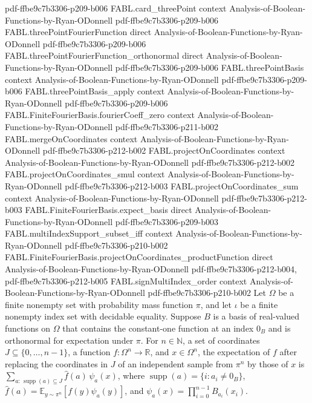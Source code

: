\begin{theorem}
  {pdf-ffbe9c7b3306-p209-b006}
\proofstep
  {FABL.card_threePoint}
  {context}
  {Analysis-of-Boolean-Functions-by-Ryan-ODonnell}
  {pdf-ffbe9c7b3306-p209-b006}
\proofstep
  {FABL.threePointFourierFunction}
  {direct}
  {Analysis-of-Boolean-Functions-by-Ryan-ODonnell}
  {pdf-ffbe9c7b3306-p209-b006}
\proofstep
  {FABL.threePointFourierFunction_orthonormal}
  {direct}
  {Analysis-of-Boolean-Functions-by-Ryan-ODonnell}
  {pdf-ffbe9c7b3306-p209-b006}
\proofstep
  {FABL.threePointBasis}
  {context}
  {Analysis-of-Boolean-Functions-by-Ryan-ODonnell}
  {pdf-ffbe9c7b3306-p209-b006}
\proofstep
  {FABL.threePointBasis_apply}
  {context}
  {Analysis-of-Boolean-Functions-by-Ryan-ODonnell}
  {pdf-ffbe9c7b3306-p209-b006}
\proofstep
  {FABL.FiniteFourierBasis.fourierCoeff_zero}
  {context}
  {Analysis-of-Boolean-Functions-by-Ryan-ODonnell}
  {pdf-ffbe9c7b3306-p211-b002}
\proofstep
  {FABL.mergeOnCoordinates}
  {context}
  {Analysis-of-Boolean-Functions-by-Ryan-ODonnell}
  {pdf-ffbe9c7b3306-p212-b002}
\proofstep
  {FABL.projectOnCoordinates}
  {context}
  {Analysis-of-Boolean-Functions-by-Ryan-ODonnell}
  {pdf-ffbe9c7b3306-p212-b002}
\proofstep
  {FABL.projectOnCoordinates_smul}
  {context}
  {Analysis-of-Boolean-Functions-by-Ryan-ODonnell}
  {pdf-ffbe9c7b3306-p212-b003}
\proofstep
  {FABL.projectOnCoordinates_sum}
  {context}
  {Analysis-of-Boolean-Functions-by-Ryan-ODonnell}
  {pdf-ffbe9c7b3306-p212-b003}
\proofstep
  {FABL.FiniteFourierBasis.expect_basis}
  {direct}
  {Analysis-of-Boolean-Functions-by-Ryan-ODonnell}
  {pdf-ffbe9c7b3306-p209-b003}
\proofstep
  {FABL.multiIndexSupport_subset_iff}
  {context}
  {Analysis-of-Boolean-Functions-by-Ryan-ODonnell}
  {pdf-ffbe9c7b3306-p210-b002}
\proofstep
  {FABL.FiniteFourierBasis.projectOnCoordinates_productFunction}
  {direct}
  {Analysis-of-Boolean-Functions-by-Ryan-ODonnell}
  {pdf-ffbe9c7b3306-p212-b004,
    pdf-ffbe9c7b3306-p212-b005}
\proofstep
  {FABL.signMultiIndex_order}
  {context}
  {Analysis-of-Boolean-Functions-by-Ryan-ODonnell}
  {pdf-ffbe9c7b3306-p210-b002}
Let $\Omega$ be a finite nonempty set with probability mass function $\pi$, and let
$\iota$ be a finite nonempty index set with decidable equality. Suppose $B$ is a basis
of real-valued functions on $\Omega$ that contains the constant-one function at an index
$0_B$ and is orthonormal for expectation under $\pi$. For $n\in\mathbb{N}$, a set of
coordinates $J\subseteq\{0,\ldots,n-1\}$, a function $f:\Omega^n\to\mathbb{R}$, and
$x\in\Omega^n$, the expectation of $f$ after replacing the coordinates in $J$ of an
independent sample from $\pi^n$ by those of $x$ is
$\sum_{a:\,\operatorname{supp}(a)\subseteq J}\widehat f(a)\,\psi_a(x)$, where
$\operatorname{supp}(a)=\{i:a_i\ne 0_B\}$, $\widehat
f(a)=\mathbb{E}_{y\sim\pi^n}[f(y)\psi_a(y)]$, and
$\psi_a(x)=\prod_{i=0}^{n-1}B_{a_i}(x_i)$.
\end{theorem}

